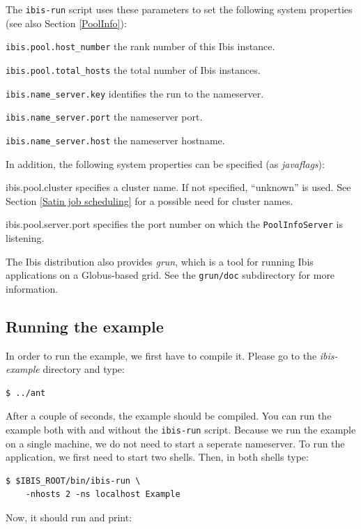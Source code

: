\documentclass[10pt]{article}
\newcommand{\mysubsection}[1]{\subsection{#1}\label{#1}}
\begin{document}
The \texttt{ibis-run} script uses these parameters to set the following
system properties (see also Section \ref{PoolInfo}):
\begin{description}
\item{\texttt{ibis.pool.host\_number}}
the rank number of this Ibis instance.
\item{\texttt{ibis.pool.total\_hosts}}
the total number of Ibis instances.
\item{\texttt{ibis.name\_server.key}}
identifies the run to the nameserver.
\item{\texttt{ibis.name\_server.port}}
the nameserver port.
\item{\texttt{ibis.name\_server.host}}
the nameserver hostname.
\end{description}

In addition, the following system properties can be specified
(as \emph{javaflags}):
\begin{description}
\item{ibis.pool.cluster}
specifies a cluster name. If not specified,
``unknown'' is used.
See Section \ref{Satin job scheduling} for a possible need for cluster
names.
\item{ibis.pool.server.port}
specifies the port number on which the
\texttt{PoolInfoServer} is listening.
\end{description}

The Ibis distribution also provides \emph{grun}, which is a tool for
running Ibis applications on a Globus-based grid. See the
\texttt{grun/doc} subdirectory for more information.

\mysubsection{Running the example}
In order to run the example, we first have to compile it.
Please go to the \emph{ibis-example} directory and type:

\noindent
{\small
\begin{verbatim}
$ ../ant
\end{verbatim}
}
\noindent
After a couple of seconds, the example should be compiled.
You can run the example both with and without the \texttt{ibis-run} script.
Because we run the example on a single machine, we do not need to start a seperate nameserver.
To run the application, we first need to start two shells.
Then, in both shells type:

\noindent
{\small
\begin{verbatim}
$ $IBIS_ROOT/bin/ibis-run \
    -nhosts 2 -ns localhost Example
\end{verbatim}
}
\noindent
Now, it should run and print:
\end{document}

